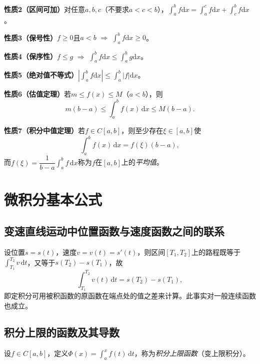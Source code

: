 \noindent\textbf{性质2（区间可加）}\quad 对任意$a,b,c$（不要求$a<c<b$），$\displaystyle\int_a^bf\mathrm{d}x=\int_a^cf\mathrm{d}x+\int_c^bf\mathrm{d}x$。

\noindent\textbf{性质3（保号性）}\quad $f\ge0$且$a<b$ $\Rightarrow$ $\displaystyle\int_a^bf\mathrm{d}x\ge0$。

\noindent\textbf{性质4（保序性）}\quad $f\le g$ $\Rightarrow$ $\displaystyle\int_a^bf\mathrm{d}x\le\int_a^bg\mathrm{d}x$。

\noindent\textbf{性质5（绝对值不等式）}\quad $\left|\displaystyle\int_a^bf\mathrm{d}x\right|\le\displaystyle\int_a^b|f|\mathrm{d}x$。

\noindent\textbf{性质6（估值定理）}\quad 若$m\le f(x)\le M$（$a<b$），则
\[
m(b-a)\le\int_a^bf(x)\,\mathrm{d}x\le M(b-a).
\]

\noindent\textbf{性质7（积分中值定理）}\quad 若$f\in C[a,b]$，则至少存在$\xi\in[a,b]$使
\[
\int_a^bf(x)\,\mathrm{d}x=f(\xi)(b-a),
\]
而$f(\xi)=\dfrac{1}{b-a}\displaystyle\int_a^bf\,\mathrm{d}x$称为$f$在$[a,b]$上的\emph{平均值}。



\section{微积分基本公式}

\subsection{变速直线运动中位置函数与速度函数之间的联系}

设位置$s=s(t)$，速度$v=v(t)=s'(t)$，则区间$[T_1,T_2]$上的路程既等于$\int_{T_1}^{T_2}v\,\mathrm{d}t$，又等于$s(T_2)-s(T_1)$，故
\[
\int_{T_1}^{T_2}v(t)\,\mathrm{d}t=s(T_2)-s(T_1),
\]
即定积分可用被积函数的原函数在端点处的值之差来计算。此事实对一般连续函数也成立。

\subsection{积分上限的函数及其导数}

设$f\in C[a,b]$，定义$\Phi(x)=\displaystyle\int_a^xf(t)\,\mathrm{d}t$，称为\emph{积分上限函数}（变上限积分）。

